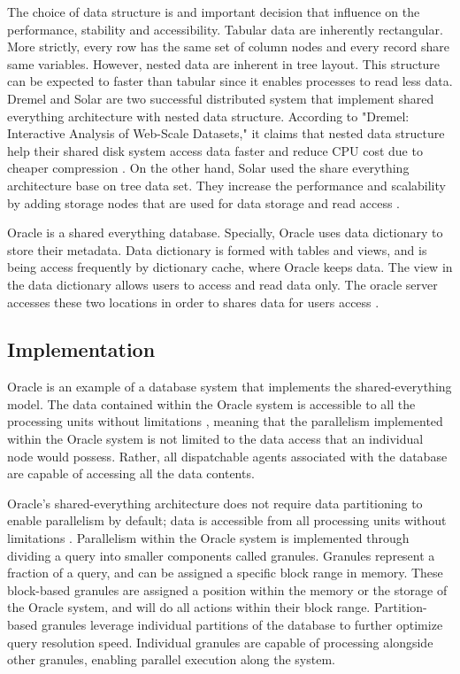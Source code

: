 \documentclass[onecolumn, draftclsnofoot,10pt, compsoc]{IEEEtran}
\begin{document}
The choice of data structure is and important decision that influence on the performance, stability and accessibility.
Tabular data are inherently rectangular.
More strictly, every row has the same set of column nodes and every record share same variables.
However, nested data are inherent in tree layout.
This structure can be expected to faster than tabular since it enables processes to read less data.
Dremel and Solar are two successful distributed system that implement shared everything architecture with nested data structure.
According to "Dremel: Interactive Analysis of Web-Scale Datasets," it claims that nested data structure help their shared disk system access data faster and reduce CPU cost due to cheaper compression \cite{Dremel}.
On the other hand, Solar used the share everything architecture base on tree data set.
They increase the performance and scalability by adding storage nodes that are used for data storage and read access \cite{zhu2018solar}.  

  Oracle is a shared everything database.
  Specially, Oracle uses data dictionary to store their metadata. 
  Data dictionary is formed with tables and views, and is being access frequently by dictionary cache, where Oracle keeps data. 
  The view in the data dictionary allows users to access and read data only.
  The oracle server accesses these two locations in order to shares data for users access \cite{OracleDataDictionary}.

    \subsection{Implementation}
Oracle is an example of a database system that implements the shared-everything model.
The data contained within the Oracle system is accessible to all the processing units without limitations \cite{OraclePEwODF}, meaning that the parallelism implemented within the Oracle system is not limited to the data access that an individual node would possess.
Rather, all dispatchable agents associated with the database are capable of accessing all the data contents.

\indent Oracle’s shared-everything architecture does not require data partitioning to enable parallelism by default; data is accessible from all processing units without limitations \cite{OraclePEwODF}. 
Parallelism within the Oracle system is implemented through dividing a query into smaller components called granules.
Granules represent a fraction of a query, and can be assigned a specific block range in memory.
These block-based granules are assigned a position within the memory or the storage of the Oracle system, and will do all actions within their block range.
Partition-based granules leverage individual partitions of the database to further optimize query resolution speed.
Individual granules are capable of processing alongside other granules, enabling parallel execution along the system. 
\end{document}
